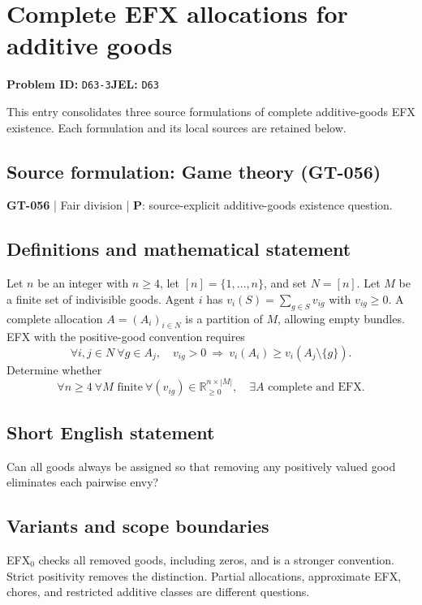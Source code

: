 \documentclass[11pt,a4paper]{article}
\begin{document}
\section*{Complete EFX allocations for additive goods}
\textbf{Problem ID:} \texttt{D63-3}\quad \textbf{JEL:} \texttt{D63}\par
\label{problem:OP-0186}
\label{audited:ECON-001}
This entry consolidates three source formulations of complete additive-goods EFX existence. Each formulation and its local sources are retained below.\par
\subsection*{Source formulation: Game theory (GT-056)}

\label{game:GT-056}
{\sffamily\small\color{muted}
\textbf{GT-056} | Fair division | \textbf{P}: source-explicit additive-goods existence question.
\par}
\subsection*{Definitions and mathematical statement}
Let $n$ be an integer with $n\geq4$, let $[n]=\{1,\ldots,n\}$, and set $N=[n]$. Let $M$ be a finite set of indivisible goods. Agent $i$ has $v_i(S)=\sum_{g\in S}v_{ig}$ with $v_{ig}\geq0$. A complete allocation $A=(A_i)_{i\in N}$ is a partition of $M$, allowing empty bundles. EFX with the positive-good convention requires
\[
 \forall i,j\in N\ \forall g\in A_j,
 \quad v_{ig}>0\ \Longrightarrow\
 v_i(A_i)\geq v_i(A_j\setminus\{g\}).
\]
Determine whether
\[
 \forall n\geq4\ \forall M\text{ finite}\ \forall(v_{ig})\in
 \mathbb R_{\geq0}^{n\times|M|},\quad
 \exists A\text{ complete and EFX}.
\]
\subsection*{Short English statement}
Can all goods always be assigned so that removing any positively valued good eliminates each pairwise envy?
\subsection*{Variants and scope boundaries}
EFX$_0$ checks all removed goods, including zeros, and is a stronger convention. Strict positivity removes the distinction. Partial allocations, approximate EFX, chores, and restricted additive classes are different questions.
\end{document}
